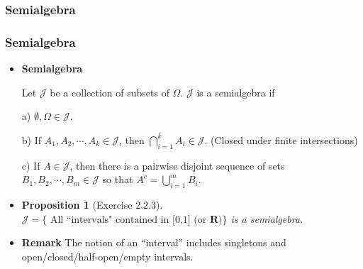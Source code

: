 \documentclass[%
]{beamer}
\newtheorem{Proposition}[theorem]{Proposition}%
\begin{document}
\subsubsection{Semialgebra}
\frame
{
  \frametitle{Semialgebra}

   \begin{itemize}

      
       \item<1->  \textbf{Semialgebra} 
       
       Let $\mathcal{J}$ be a collection of subsets of $\Omega$.  $\mathcal{J}$ is a semialgebra if 
       
       
       a) $\emptyset, \Omega \in \mathcal{J}$.
       
    
       b) If $A_1, A_2,\cdots, A_k \in \mathcal{J}$, then $\bigcap_{i=1}^k A_i \in \mathcal{J}$. (Closed under finite intersections) 
       

       c) If $A \in \mathcal{J}$, then there is a pairwise disjoint sequence of sets $B_1, B_2,\cdots, B_m \in \mathcal{J}$ so that $A^c=\bigcup_{i=1}^m B_i$. 
       
       \item<2-> [] \begin{Proposition}[Exercise 2.2.3] $\mathcal{J}=\{\text{ All ``intervals" contained in [0,1] (or } \mathbf{R})\}$  is a semialgebra.  \end{Proposition}
       
              \item<3-> \textbf{Remark} The notion of an ``interval'' includes singletons and open/closed/half-open/empty intervals. 
         
                 \end{itemize}
}
\end{document}
